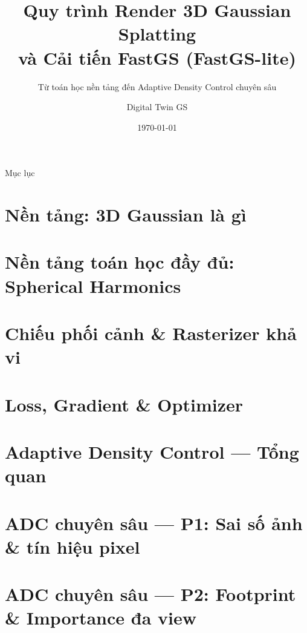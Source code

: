 \documentclass[aspectratio=169,9pt]{beamer}
\title[FastGS-lite: 3DGS \& Tăng tốc]{Quy trình Render 3D Gaussian Splatting\\và Cải tiến FastGS (FastGS-lite)}
\subtitle{Từ toán học nền tảng đến Adaptive Density Control chuyên sâu}
\author{Digital Twin GS}
\date{\today}
\begin{document}
\begin{frame}
\titlepage
\end{frame}

\begin{frame}{Mục lục}
\tiny
\tableofcontents
\end{frame}

\section{Nền tảng: 3D Gaussian là gì}


\section{Nền tảng toán học đầy đủ: Spherical Harmonics}



\section{Chiếu phối cảnh \& Rasterizer khả vi}


\section{Loss, Gradient \& Optimizer}


\section{Adaptive Density Control — Tổng quan}


\section{ADC chuyên sâu — P1: Sai số ảnh \& tín hiệu pixel}



\section{ADC chuyên sâu — P2: Footprint \& Importance đa view}


\end{document}
